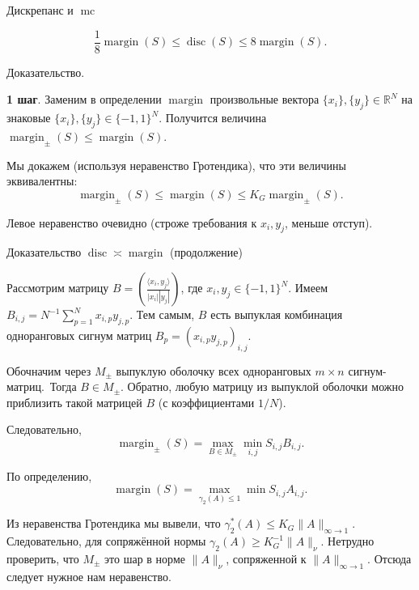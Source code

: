 \documentclass[handout]{beamer}
\renewcommand\le{\leqslant}
\renewcommand\ge{\geqslant}
\newcommand\R{\mathbb R}
\DeclareMathOperator{\disc}{disc}
\DeclareMathOperator{\margin}{margin}
\DeclareMathOperator{\mc}{mc}
\begin{document}
\begin{frame}{Дискрепанс и $\mc$}
    \begin{theorem}
        $$
        \frac18\margin(S) \le \disc(S) \le 8\margin(S).
        $$
    \end{theorem}
    \pause

    Доказательство.\pause
    
    \textbf{1 шаг}. Заменим в определении $\margin$ произвольные
    вектора $\{x_i\},\{y_j\}\in\R^N$ на знаковые
    $\{x_i\},\{y_j\}\in\{-1,1\}^N$. Получится величина
    $\margin_\pm(S)\le\margin(S)$.
    \pause\vspace{5pt}

    Мы докажем (используя неравенство Гротендика), что эти величины эквивалентны:
    $$\margin_\pm(S) \le \margin(S) \le K_G\margin_\pm(S).$$
    \pause

    Левое неравенство очевидно (строже требования к $x_i,y_j$, меньше отступ).

\end{frame}
\begin{frame}{Доказательство $\disc\asymp\margin$ (продолжение)}

    Рассмотрим матрицу $B=(\frac{\langle x_i, y_j\rangle}{|x_i||y_j|})$, где
    $x_i,y_j\in\{-1,1\}^N$. Имеем $B_{i,j} = N^{-1}\sum_{p=1}^N x_{i,p}y_{j,p}$.
    Тем самым, $B$ есть выпуклая комбинация 
    одноранговых сигнум матриц $B_p=(x_{i,p}y_{j,p})_{i,j}$.
    \pause

    Обочначим через $M_\pm$ выпуклую оболочку всех одноранговых $m\times n$
    сигнум-матриц.\pause~Тогда $B\in M_\pm$. Обратно, любую матрицу из выпуклой
    оболочки можно приблизить такой матрицей $B$ (с коэффициентами $1/N$).
    \pause

    Следовательно,
    $$
    \margin_\pm(S) = \max_{B\in M_\pm} \min_{i,j}S_{i,j}B_{i,j}.
    $$
    \pause

    По определению,
    $$
    \margin(S) = \max_{\gamma_2(A)\le 1} \min S_{i,j}A_{i,j}.
    $$
    \pause

    Из неравенства Гротендика мы вывели, что $\gamma_2^*(A)\le K_G\|A\|_{\infty\to1}$. Следовательно,
    для сопряжённой нормы $\gamma_2(A)\ge K_G^{-1}\|A\|_\nu$. Нетрудно
    проверить, что $M_\pm$ это шар в норме $\|A\|_\nu$, сопряженной к
    $\|A\|_{\infty\to1}$. Отсюда следует нужное нам неравенство.

\end{frame}
\end{document}
